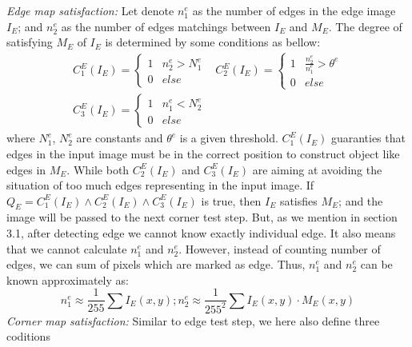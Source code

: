 \textit{Edge map satisfaction:} Let denote $n_{1}^{e}$ as the number of edges in the edge image $I_E$; and $n_{2}^{e}$ as the number of edges matchings between $I_E$ and $M_E$.
The degree of satisfying $M_E$ of $I_E$ is determined by some conditions as
bellow:
\begin{equation}
 \begin{array}{rcl}
   C_1^E(I_E) = \left\{ 
   \begin{array}{rcl}
   1 &  n_2^e > N_1^e \\
   0 &  else
   \end{array}\right. &
   C_2^E(I_E) = \left\{ 
    \begin{array}{rcl}
    1 &  \frac{n_2^e}{n_1^e} > \theta^e \\
    0 & else
    \end{array}\right. \\
   
   C_3^E(I_E) = \left\{ 
   \begin{array}{rcl}
   1 & n_1^e < N_2^e \\
   0 & else
   \end{array}\right. &
   \mbox{~~~~~}
 \end{array}
  \label{eq:edge_map_satisfy}
\end{equation}
where $N_1^e$, $N_2^e$ are constants and $\theta^e$ is a given threshold.
$C_1^E(I_E)$ guaranties that edges in the input image must be in the correct
position to construct object like edges in $M_E$. While both $C_2^E(I_E)$ and $C_3^E(I_E)$
are aiming at avoiding the situation of too much edges representing in the input image. If $Q_E = C_1^E(I_E) \wedge C_2^E(I_E) \wedge C_3^E(I_E)$ is true, then $I_E$ satisfies $M_E$; and the image will be passed to the next corner test step.
But, as we mention in section 3.1, after detecting edge we cannot
know exactly individual edge. It also means that we cannot calculate $n_1^e$ and $n_2^e$. However, instead of counting number of edges, we can sum of pixels which are marked as edge. Thus, $n_1^e$ and $n_2^e$ can be known approximately as:
\begin{equation}
 n_1^e \approx \frac{1}{255} \sum I_E(x,y);
 \mbox{}
 n_2^e \approx \frac{1}{255^2} \sum I_E(x,y)\cdot M_E(x,y)
   \label{eq:n_1_e_and_n_2_e}
\end{equation}
\textit{Corner map satisfaction:} 
Similar to edge test step, we here also define three coditions
